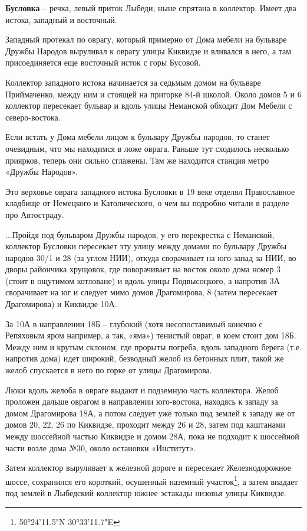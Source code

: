 \medskip

\textbf{Бусловка} – речка, левый приток Лыбеди, ныне спрятана в коллектор. Имеет два истока, западный и восточный.

Западный протекал по оврагу, который примерно от Дома мебели на бульваре Дружбы Народов выруливал к оврагу улицы Киквидзе и вливался в него, а там присоединяется еще восточный исток с горы Бусовой.

Коллектор западного истока начинается за седьмым домом на бульваре Приймаченко, между ним и стоящей на пригорке 84-й школой. Около домов 5 и 6 коллектор пересекает бульвар и вдоль улицы Неманской обходит Дом Мебели с северо-востока.

Если встать у Дома мебели лицом к бульвару Дружбы народов, то станет очевидным, что мы находимся в ложе оврага. Раньше тут сходилось несколько приярков, теперь они сильно сглажены. Там же находится станция метро «Дружбы Народов». 

Это верховье оврага западного истока Бусловки в 19 веке отделял Православное кладбище от Немецкого и Католического, о чем вы подробно читали в разделе про Автостраду.

...Пройдя под бульваром Дружбы народов, у его перекрестка с Неманской, коллектор Бусловки пересекает эту улицу между домами по бульвару Дружбы народов 30/1 и 28 (за углом НИИ), откуда сворачивает на юго-запад за НИИ, во дворы райончика хрущовок, где поворачивает на восток около дома номер 3 (стоит в ощутимом котловане) и вдоль улицы Подвысоцкого, а напротив 3А сворачивает на юг и следует мимо домов Драгомирова, 8 (затем пересекает Драгомирова) и Киквидзе 10А.

За 10А в направлении 18Б – глубокий (хотя несопоставимый конечно с Репяховым яром например, а так, «яма») тенистый овраг, в коем стоит дом 18Б. Между ним и крутым склоном, где прорыты погреба, вдоль западного берега (т.е. напротив дома) идет широкий, безводный желоб из бетонных плит, такой же желоб спускается в него по горке от улицы Драгомирова.  

Люки вдоль желоба в овраге выдают и подземную часть коллектора. Желоб проложен дальше оврагом в направлении юго-востока, находясь к западу за домом Драгомирова 18А, а потом следует уже только под землей к западу же от домов 20, 22, 26 по Киквидзе, проходит между 26 и 28, затем под каштанами между шоссейной частью Киквидзе и домом 28А, пока не подходит к шоссейной части возле дома №30, около остановки «Институт».

Затем коллектор выруливает к железной дороге и пересекает Железнодорожное шоссе, сохранился его короткий, осушенный наземный участок\footnote{50°24'11.5"N 30°33'11.7"E}, а затем впадает под землей в Лыбедский коллектор южнее эстакады низовья улицы Киквидзе.

